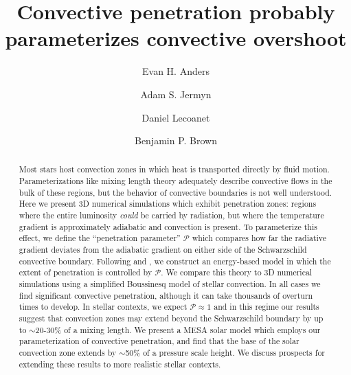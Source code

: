 \documentclass[twocolumn]{aastex631}
\newcommand{\mP}{\ensuremath{\mathcal{P}}}
\begin{document}
\title{Convective penetration probably parameterizes convective overshoot}
\author[0000-0002-3433-4733]{Evan H. Anders}
\author[0000-0001-5048-9973]{Adam S. Jermyn}
\author[0000-0002-7635-9728]{Daniel Lecoanet}
\author[0000-0001-8935-219X]{Benjamin P. Brown}


\begin{abstract}
Most stars host convection zones in which heat is transported directly by fluid motion.
Parameterizations like mixing length theory adequately describe convective flows in the bulk of these regions, but the behavior of convective boundaries is not well understood.
Here we present 3D numerical simulations which exhibit penetration zones: regions where the entire luminosity \emph{could} be carried by radiation, but where the temperature gradient is approximately adiabatic and convection is present.
To parameterize this effect, we define the ``penetration parameter'' $\mP$ which compares how far the radiative gradient deviates from the adiabatic gradient on either side of the Schwarzschild convective boundary.
Following \citet{roxburgh1989} and \citet{zahn1991}, we construct an energy-based model in which the extent of penetration is controlled by $\mP$.
We compare this theory to 3D numerical simulations using a simplified Boussinesq model of stellar convection.
In all cases we find significant convective penetration, although it can take thousands of overturn times to develop.
In stellar contexts, we expect $\mathcal{P} \approx 1$ and in this regime our results suggest that convection zones may extend beyond the Schwarzschild boundary by up to $\sim$20-30\% of a mixing length.
We present a MESA solar model which employs our parameterization of convective penetration, and find that the base of the solar convection zone extends by $\sim$50\% of a pressure scale height.
We discuss prospects for extending these results to more realistic stellar contexts.
\end{abstract}
\end{document}

